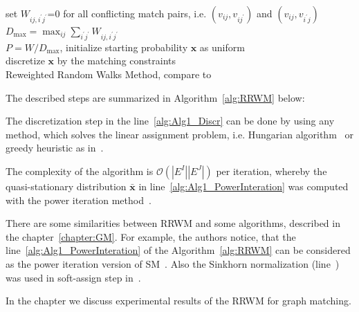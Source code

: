 \begin{algorithm}[h] 
	set $W_{ij,i^\prime j^\prime}$=0 for all conflicting match pairs, i.e. $(v_{ij},v_{ij^\prime})$ and $(v_{ij},v_{i^\prime j})$ \\
	$D_{\text{max}}=\max_{ij}\sum_{i^\prime j^\prime}W_{ij,i^\prime j^\prime}$ \\
	$P=W/D_{\text{max}}$, initialize starting probability $\mathbf{x}$ as uniform\\
	discretize $\mathbf{x}$ by the matching constraints \label{alg:Alg1_Discr} \\
	\caption{Reweighted Random Walks Method, compare to~\cite{Cho2010_RRWM}}    
	\label{alg:RRWM}
\end{algorithm}

The described steps are summarized in Algorithm~\ref{alg:RRWM} below:

The discretization step in the line~\ref{alg:Alg1_Discr} can be done by using any method, which solves the linear assignment problem, i.e. Hungarian algorithm~\cite{Kuhn1955} or greedy heuristic as in~\cite{Leordeanu2005_SM}.

The complexity of the algorithm is $\mathcal{O}(|E^I||E^J|)$ per iteration, whereby the quasi-stationary distribution $\mathbf{\bar{x}}$ in line~\ref{alg:Alg1_PowerInteration} was computed with the power iteration method~\cite{PowerIteration}.

There are some similarities between RRWM and some algorithms, described in the chapter~\ref{chapter:GM}. For example, the authors notice, that the line~\ref{alg:Alg1_PowerInteration} of the Algorithm~\ref{alg:RRWM} can be considered as the power iteration version of SM~\cite{Leordeanu2005_SM}. Also the Sinkhorn normalization (line~) was used in soft-assign step in~\cite{Rangarajan1996_GAGM}. 

In the chapter  we discuss experimental results of the RRWM for graph matching.


